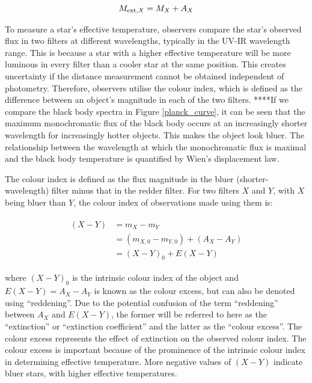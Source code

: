 \documentclass[12pt, a4paper]{report}
\begin{document}
\begin{equation}
M_{\textnormal{ext},X} = M_{X} + A_{X}
\end{equation}

To measure a star's effective temperature, observers compare the star's observed flux in two filters at different wavelengths, typically in the UV-IR wavelength range. This is because a star with a higher effective temperature will be more luminous in every filter than a cooler star at the same position. This creates uncertainty if the distance measurement cannot be obtained independent of photometry. Therefore, observers utilise the colour index, which is defined as the difference between an object's magnitude in each of the two filters. ****If we compare the black body spectra in Figure \ref{planck_curve}, it can be seen that the maximum monochromatic flux of the black body occurs at an increasingly shorter wavelength for increasingly hotter objects. This makes the object look bluer. The relationship between the wavelength at which the monochromatic flux is maximal and the black body temperature is quantified by Wien's displacement law.

The colour index is defined as the flux magnitude in the bluer (shorter-wavelength) filter minus that in the redder filter. For two filters $X$ and $Y$, with $X$ being bluer than $Y$, the colour index of observations made using them is:

\begin{align}
\begin{split}
(X-Y) &= m_{X} - m_{Y} \\
&= (m_{X,0} - m_{Y,0}) + (A_{X} - A_{Y}) \\
&= (X-Y)_{0} + E(X-Y)
\end{split}
\end{align}

where $(X-Y)_{0}$ is the intrinsic colour index of the object and $E(X-Y) = A_{X} - A_{Y}$ is known as the colour excess, but can also be denoted using ``reddening''. Due to the potential confusion of the term ``reddening'' between $A_{X}$ and $E(X-Y)$, the former will be referred to here as the ``extinction'' or ``extinction coefficient'' and the latter as the ``colour excess''. The colour excess represents the effect of extinction on the observed colour index. The colour excess is important because of the prominence of the intrinsic colour index in determining effective temperature. More negative values of $(X-Y)$ indicate bluer stars, with higher effective temperatures.
\end{document}
